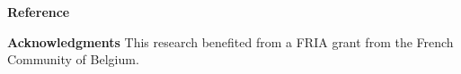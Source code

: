 
\textbf{Reference}
\printbibliography[heading=none]

\textbf{Acknowledgments}
This research benefited from a FRIA grant from the French Community of Belgium.
